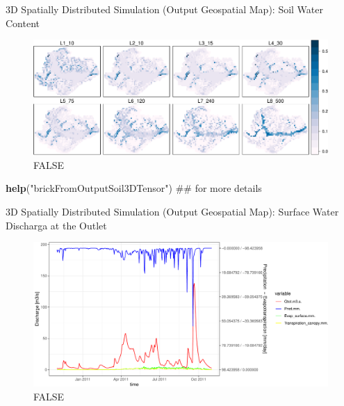 \documentclass[ignorenonframetext,]{beamer}
\newenvironment{Shaded}{\begin{snugshade}}{\end{snugshade}}
\newcommand{\KeywordTok}[1]{\textcolor[rgb]{0.13,0.29,0.53}{\textbf{#1}}}
\newcommand{\StringTok}[1]{\textcolor[rgb]{0.31,0.60,0.02}{#1}}
\newcommand{\NormalTok}[1]{#1}
\begin{document}
\begin{frame}[fragile]{3D Spatially Distributed Simulation (Output
Geospatial Map): Soil Water Content}

\begin{figure}
\centering
\includegraphics{presentation_files/figure-beamer/unnamed-chunk-15-1.pdf}
\caption{FALSE}
\end{figure}

\begin{Shaded}
\begin{Highlighting}[]
\KeywordTok{help}\NormalTok{(}\StringTok{"brickFromOutputSoil3DTensor"}\NormalTok{) ## for more details}
\end{Highlighting}
\end{Shaded}

\end{frame}

\begin{frame}{3D Spatially Distributed Simulation (Output Geospatial
Map): Surface Water Discharga at the Outlet}

\begin{figure}
\centering
\includegraphics{presentation_files/figure-beamer/unnamed-chunk-18-1.pdf}
\caption{FALSE}
\end{figure}

\end{frame}
\end{document}
